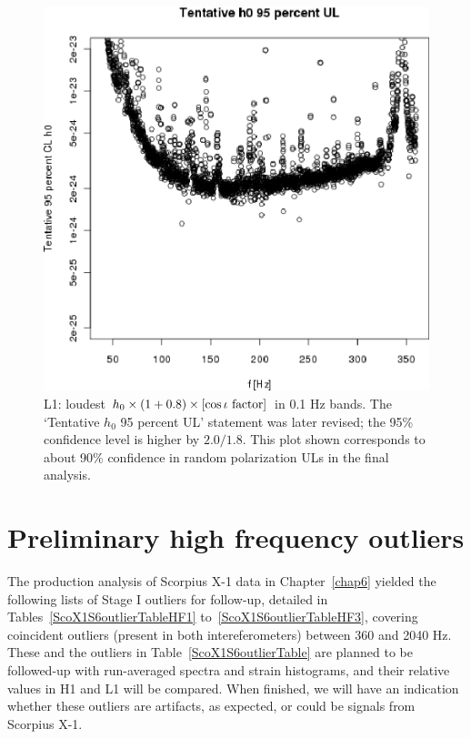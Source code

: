 \begin{figure}
\begin{center}
\includegraphics[width=0.68\paperwidth,height=0.48\paperheight]{plots/h0FullUL95logGuess-L1.eps}
\caption{
L1: loudest $h_0 \times \left( 1 + 0.8 \right) \times \left[\cos \iota \textup{ factor}\right]$ in 0.1 Hz bands. 
The `Tentative $h_0$ 95 percent UL' statement was later revised; the 95\% confidence level is higher by $2.0/1.8$.
This plot shown corresponds to about 90\% confidence in random polarization ULs in the final analysis.}
\label{S6_L1_UL}
\end{center}
\end{figure}


\section{Preliminary high frequency outliers}

The production analysis of Scorpius X-1 data in Chapter~\ref{chap6} yielded the following lists of Stage I outliers for follow-up, detailed in Tables~\ref{ScoX1S6outlierTableHF1} to~\ref{ScoX1S6outlierTableHF3}, covering coincident outliers (present in both intereferometers) between 360 and 2040 Hz.
These and the outliers in Table~\ref{ScoX1S6outlierTable} are planned to be followed-up with run-averaged spectra and strain histograms, and their relative values in H1 and L1 will be compared.
When finished, we will have an indication whether these outliers are artifacts, as expected, or could be signals from Scorpius X-1.

